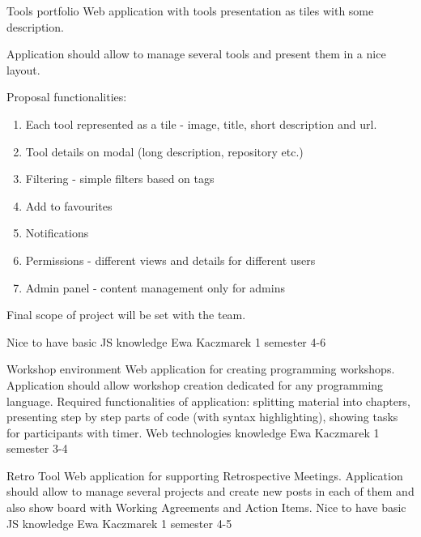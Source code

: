 \begin{project}
{Tools portfolio}
{Web application with tools presentation as tiles with some description.} 
{
Application should allow to manage several tools and present them in a nice layout.

Proposal functionalities:

\begin{enumerate}
	\item Each tool represented as a tile - image, title, short description and url.
	\item Tool details on modal (long description, repository etc.)
	\item Filtering - simple filters based on tags
	\item Add to favourites
	\item Notifications
	\item Permissions - different views and details for different users
	\item Admin panel - content management only for admins
\end{enumerate}

Final scope of project will be set with the team.
}
{Nice to have basic JS knowledge}
{Ewa Kaczmarek}
{1 semester}
{4-6}
\end{project}
\begin{project}
{Workshop environment}
{Web application for creating programming workshops.} 
{
Application should allow workshop creation dedicated for any programming language. Required functionalities of application: splitting material into chapters, presenting step by step parts of code (with syntax highlighting), showing tasks for participants with timer.
}
{Web technologies knowledge}
{Ewa Kaczmarek}
{1 semester}
{3-4}
\end{project}
\begin{project}
{Retro Tool}
{Web application for supporting Retrospective Meetings.}
{
Application should allow to manage several projects and create new posts in each of them and also show board with Working Agreements and Action Items.
}
{Nice to have basic JS knowledge}
{Ewa Kaczmarek}
{1 semester}
{4-5}
\end{project}

